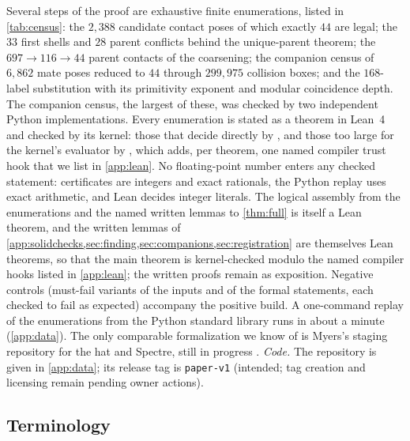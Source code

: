 Several steps of the proof are exhaustive finite enumerations, listed in \cref{tab:census}: the
$2{,}388$ candidate contact poses of which exactly $44$ are legal; the $33$ first shells and $28$
parent conflicts behind the unique-parent theorem; the $697\to116\to44$ parent contacts of the
coarsening; the companion census of $6{,}862$ mate poses reduced to $44$ through $299{,}975$
collision boxes; and the $168$-label substitution with its primitivity exponent and modular
coincidence depth. The companion census, the largest of these, was checked by two independent
Python implementations. Every enumeration is stated as a
theorem in Lean~4 and checked by its kernel: those that decide directly by , and
those too large for the kernel's evaluator by , which adds, per theorem, one
named compiler trust hook that we list in \cref{app:lean}. No floating-point number enters any
checked statement: certificates are integers and exact rationals, the Python replay uses exact
arithmetic, and Lean decides integer literals. The logical assembly from the enumerations and the
named written lemmas to \cref{thm:full} is itself a Lean theorem, and the written lemmas of
\cref{app:solidchecks,sec:finding,sec:companions,sec:registration} are themselves Lean theorems, so that
the main theorem is kernel-checked modulo the named compiler hooks listed in \cref{app:lean}; the
written proofs remain as exposition. Negative
controls (must-fail variants of the inputs and of the formal statements, each checked to fail as
expected) accompany the positive build. A one-command replay of the enumerations from the Python
standard library runs in about a minute (\cref{app:data}). The only comparable formalization we
know of is Myers's staging repository for the hat and Spectre, still in progress
\cite{Mye24lean,Lean4}. \emph{Code.} The repository is given in \cref{app:data}; its release tag is
\texttt{paper-v1} (intended; tag creation and licensing remain pending owner actions).

\subsection{Terminology}\label{sec:terminology}

